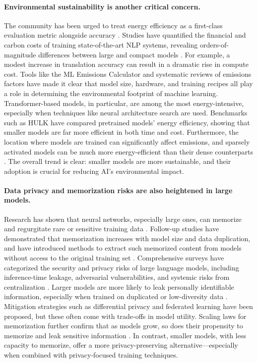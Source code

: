 \paragraph{Environmental sustainability is another critical concern.} The community has been urged to treat energy efficiency as a first-class evaluation metric alongside accuracy \citep{schwartz2020greenai}. Studies have quantified the financial and carbon costs of training state-of-the-art NLP systems, revealing orders-of-magnitude differences between large and compact models \citep{strubell2019energy}. For example, a modest increase in translation accuracy can result in a dramatic rise in compute cost. Tools like the ML Emissions Calculator \citep{lacoste2019quantifying} and systematic reviews of emissions factors \citep{luccioni2023counting} have made it clear that model size, hardware, and training recipes all play a role in determining the environmental footprint of machine learning. Transformer-based models, in particular, are among the most energy-intensive, especially when techniques like neural architecture search are used. Benchmarks such as HULK \citep{zhou2021hulk} have compared pretrained models’ energy efficiency, showing that smaller models are far more efficient in both time and cost. Furthermore, the location where models are trained can significantly affect emissions, and sparsely activated models can be much more energy-efficient than their dense counterparts \citep{patterson2021carbon}. The overall trend is clear: smaller models are more sustainable, and their adoption is crucial for reducing AI's environmental impact.

\paragraph{Data privacy and memorization risks are also heightened in large models.} Research has shown that neural networks, especially large ones, can memorize and regurgitate rare or sensitive training data \citep{feldman2020neural, carlini2019secret}. Follow-up studies have demonstrated that memorization increases with model size and data duplication, and have introduced methods to extract such memorized content from models without access to the original training set \citep{carlini2021extracting, carlini2022quantifying}. Comprehensive surveys have categorized the security and privacy risks of large language models, including inference-time leakage, adversarial vulnerabilities, and systemic risks from centralization \citep{yao2024privacysurvey}. Larger models are more likely to leak personally identifiable information, especially when trained on duplicated or low-diversity data \citep{huang2022large, neel2023privacy}. Mitigation strategies such as differential privacy \citep{dwork2006calibrating} and federated learning \citep{mcmahan2017communication} have been proposed, but these often come with trade-offs in model utility. Scaling laws for memorization further confirm that as models grow, so does their propensity to memorize and leak sensitive information \citep{lu2024scaling, biderman2023emergent, kiyomaru2024comprehensive}. In contrast, smaller models, with less capacity to memorize, offer a more privacy-preserving alternative—especially when combined with privacy-focused training techniques.

